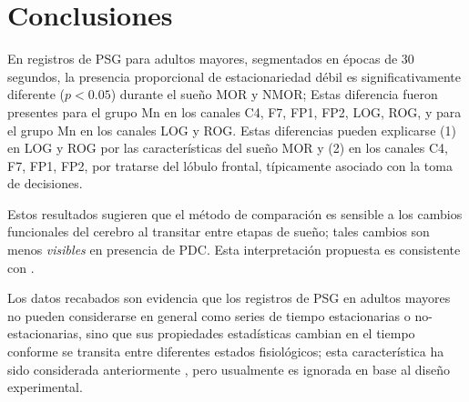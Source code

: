 

\section{Conclusiones}

En registros de PSG para adultos mayores, segmentados en épocas de 30 segundos, la presencia 
proporcional de estacionariedad débil es significativamente diferente ($p<0.05$) durante el sueño 
MOR y NMOR;
Estas diferencia fueron presentes para el grupo Mn en los canales C4, F7, FP1, FP2, LOG, ROG, y 
para el grupo Mn en los canales LOG y ROG.
Estas diferencias pueden explicarse 
(1) en LOG y ROG por las características del sueño MOR y
(2) en los canales C4, F7, FP1, FP2, por tratarse del lóbulo frontal, típicamente asociado con la 
toma de decisiones.


Estos resultados sugieren que el método de comparación es sensible a los cambios funcionales del 
cerebro al transitar entre etapas de sueño; tales cambios son menos \textit{visibles} en presencia
de PDC. Esta interpretación propuesta es consistente con \cite{Valeria}.


Los datos recabados son evidencia que los registros de PSG en adultos mayores no pueden 
considerarse en general como series de tiempo estacionarias o no-estacionarias, sino que sus 
propiedades estadísticas cambian en el tiempo conforme se transita entre diferentes estados 
fisiológicos; 
esta característica ha sido considerada anteriormente \cite{Kaiser00}, pero usualmente es ignorada
en base al diseño experimental.

